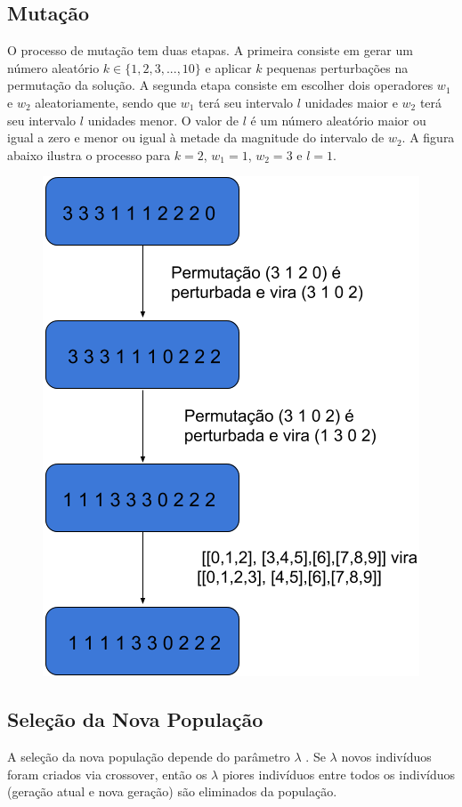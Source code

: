 \documentclass{article}
\begin{document}
\subsection{Mutação}
\quad O processo de mutação tem duas etapas. A primeira consiste em gerar um número aleatório $k\in \{1, 2, 3,...,10\}$ e aplicar $k$ pequenas perturbações na permutação da solução. A segunda etapa consiste em escolher dois operadores $w_{1}$ e $w_{2}$ aleatoriamente, sendo que $w_{1}$ terá seu intervalo $l$ unidades maior e $w_{2}$ terá seu intervalo $l$ unidades menor. O valor de $l$ é um número aleatório maior ou igual a zero e menor ou igual à metade da magnitude do intervalo de $w_{2}$. A figura abaixo ilustra o processo para $k=2$, $w_{1} = 1$, $w_{2} = 3$ e $l=1$.
\begin{figure}[tph!]
\centering
\includegraphics[scale=0.35]{figure3}
\end{figure}

\subsection{Seleção da Nova População}
\quad A seleção da nova população depende do parâmetro $\lambda$ . Se $\lambda$ novos indivíduos foram criados via crossover, então os $\lambda$ piores indivíduos  entre todos os indivíduos (geração atual e nova geração) são eliminados da população.
\end{document}
